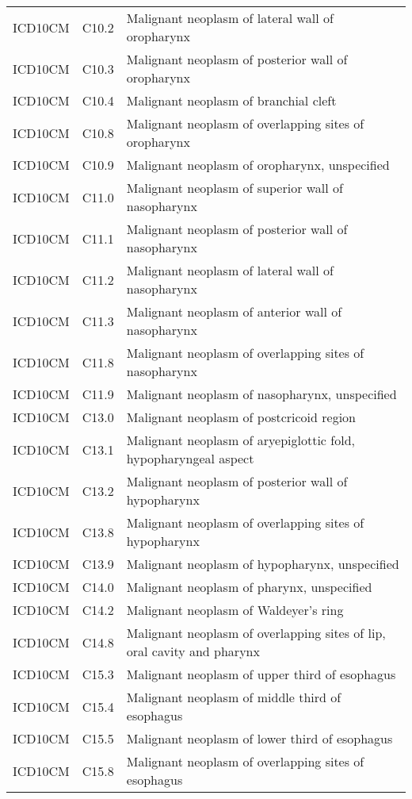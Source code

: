 \begin{table}[ht]
\begin{tabular}{lll}
  ICD10CM & C10.2 & Malignant neoplasm of lateral wall of oropharynx \\ 
  ICD10CM & C10.3 & Malignant neoplasm of posterior wall of oropharynx \\ 
  ICD10CM & C10.4 & Malignant neoplasm of branchial cleft \\ 
  ICD10CM & C10.8 & Malignant neoplasm of overlapping sites of oropharynx \\ 
  ICD10CM & C10.9 & Malignant neoplasm of oropharynx, unspecified \\ 
  ICD10CM & C11.0 & Malignant neoplasm of superior wall of nasopharynx \\ 
  ICD10CM & C11.1 & Malignant neoplasm of posterior wall of nasopharynx \\ 
  ICD10CM & C11.2 & Malignant neoplasm of lateral wall of nasopharynx \\ 
  ICD10CM & C11.3 & Malignant neoplasm of anterior wall of nasopharynx \\ 
  ICD10CM & C11.8 & Malignant neoplasm of overlapping sites of nasopharynx \\ 
  ICD10CM & C11.9 & Malignant neoplasm of nasopharynx, unspecified \\ 
  ICD10CM & C13.0 & Malignant neoplasm of postcricoid region \\ 
  ICD10CM & C13.1 & Malignant neoplasm of aryepiglottic fold, hypopharyngeal aspect \\ 
  ICD10CM & C13.2 & Malignant neoplasm of posterior wall of hypopharynx \\ 
  ICD10CM & C13.8 & Malignant neoplasm of overlapping sites of hypopharynx \\ 
  ICD10CM & C13.9 & Malignant neoplasm of hypopharynx, unspecified \\ 
  ICD10CM & C14.0 & Malignant neoplasm of pharynx, unspecified \\ 
  ICD10CM & C14.2 & Malignant neoplasm of Waldeyer's ring \\ 
  ICD10CM & C14.8 & Malignant neoplasm of overlapping sites of lip, oral cavity and pharynx \\ 
  ICD10CM & C15.3 & Malignant neoplasm of upper third of esophagus \\ 
  ICD10CM & C15.4 & Malignant neoplasm of middle third of esophagus \\ 
  ICD10CM & C15.5 & Malignant neoplasm of lower third of esophagus \\ 
  ICD10CM & C15.8 & Malignant neoplasm of overlapping sites of esophagus \\ 

\end{tabular}
\end{table}
